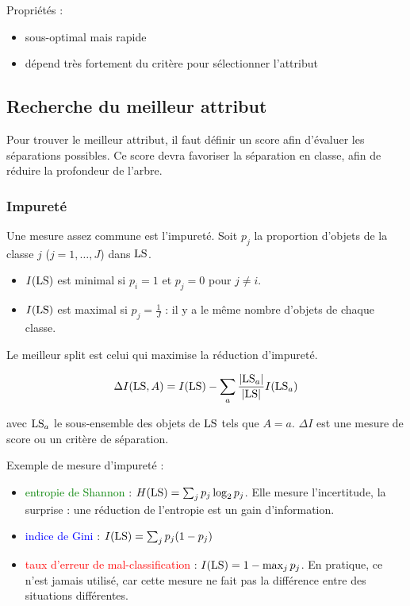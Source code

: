 	Propriétés : 
	
	\begin{itemize}
		\item sous-optimal mais rapide
		\item dépend très fortement du critère pour sélectionner l'attribut
	\end{itemize}
	
	\subsection{Recherche du meilleur attribut}
	
	Pour trouver le meilleur attribut, il faut définir un score afin d'évaluer les séparations possibles. Ce score devra favoriser la séparation en classe, afin de réduire la profondeur de l'arbre.
	
	
		\subsubsection{Impureté}
		
		Une mesure assez commune est l'impureté. Soit $p_j$ la proportion d'objets de la classe $j$ ($j = 1, \dots , J$) dans $\text{LS}$.
		
		\begin{itemize}
			\item $I(\text{LS})$ est minimal si $p_i = 1$ et $p_j = 0$ pour $j \neq i$.
			\item $I(\text{LS})$ est maximal si $p_j = \frac{1}{J}$ : il y a le même nombre d'objets de chaque classe.
		\end{itemize}
		
		Le meilleur split est celui qui maximise la réduction d'impureté.
		
		$$\Delta I(\text{LS}, A) = I(\text{LS}) - \sum_a \frac{\vert \text{LS}_a \vert}{\vert \text{LS} \vert} I(\text{LS}_a)$$
		
		avec $\text{LS}_a$ le sous-ensemble des objets de $\text{LS}$ tels que $A = a$. $\Delta I$ est une mesure de score ou un critère de séparation.
		
		
		
		Exemple de mesure d'impureté :
		
		\begin{itemize}
			\item \textcolor{green}{entropie de Shannon} : $H(\text{LS}) = \sum_j p_j \log_2 p_j$. Elle mesure l'incertitude, la surprise : une réduction de l'entropie est un gain d'information.
			
			\item \textcolor{blue}{indice de Gini} : $I(\text{LS}) = \sum_j p_j(1 - p_j)$
			\item \textcolor{red}{taux d'erreur de mal-classification} : $I(\text{LS}) = 1 - \max_j p_j$. En pratique, ce n'est jamais utilisé, car cette mesure ne fait pas la différence entre des situations différentes.
			
		\end{itemize}
		
